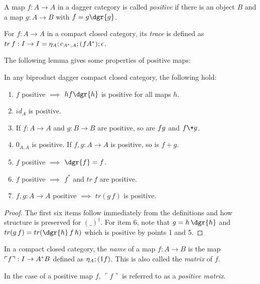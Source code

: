 \begin{definition}\label{def:positivemap}
  A map $f:A\to A$ in a dagger category is called \emph{positive} if there is an object $B$ and a
  map $g:A\to B$ with $f = g \dgr{g}$.
\end{definition}

\begin{definition}\label{def:tracecp}
  For $f:A\to A$ in a compact closed category, its \emph{trace} is defined as $tr\, f:I\to I =
  \eta_{A} ; c_{A^{*},A} ; (f\*A^{*}) ; \epsilon$.
\end{definition}

The following lemma gives some properties of positive maps:

\begin{lemma}\label{lemma:positivemaps}
  In any biproduct dagger compact closed category, the following hold:
  \begin{enumerate}
    \item{} $f$ positive $\implies$ $h f \dgr{h}$ is positive for all maps $h$.
    \item{} $id_{A}$ is positive.
    \item If $f:A\to A$ and $g:B\to B$ are positive, so are $f\*g$ and $f\+g$.
    \item $0_{A,A}$ is positive. If $f,g:A\to A$ is positive, so is $f+g$.
    \item $f$ positive $\implies$ $\dgr{f}=f$.
    \item $f$ positive $\implies$ $f^{*}$ and $tr\ f$ are positive.
    \item $f,g:A\to A$ positive $\implies$ $tr (g\,f)$ is positive.
  \end{enumerate}
\end{lemma}
\begin{proof}
  The first six items follow immediately from the definitions and how structure is preserved for
  $(\_)^{\dagger}$. For item 6, note that $g = h\, \dgr{h}$ and $tr(g\,f) = tr(\dgr{h}\,f\,h)$
  which is positive by points 1 and 5.%
\end{proof}

\begin{definition}\label{def:name}
  In a compact closed category, the \emph{name} of a map $f:A\to B$ is the map $\ulcorner f
  \urcorner:I \to A^{*} \* B$ defined as $\eta_{A}; (1\*f)$. This is also called the \emph{matrix} of
  $f$.
\end{definition}

In the case of a positive map $f$, $\ulcorner f \urcorner$ is referred to as a \emph{positive
matrix}.

